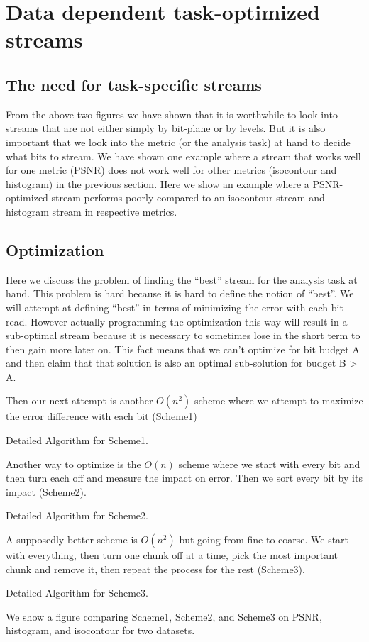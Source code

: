 \section{Data dependent task-optimized streams}

\subsection{The need for task-specific streams}
From the above two figures we have shown that it is worthwhile to look into streams that are not either simply by bit-plane or by levels. But it is also important that we look into the metric (or the analysis task) at hand to decide what bits to stream. We have shown one example where a stream that works well for one metric (PSNR) does not work well for other metrics (isocontour and histogram) in the previous section. Here we show an example where a PSNR-optimized stream performs poorly compared to an isocontour stream and histogram stream in respective metrics.

\subsection{Optimization}
Here we discuss the problem of finding the ``best'' stream for the analysis task at hand. This problem is hard because it is hard to define the notion of ``best''. We will attempt at defining ``best'' in terms of minimizing the error with each bit read. However actually programming the optimization this way will result in a sub-optimal stream because it is necessary to sometimes lose in the short term to then gain more later on. This fact means that we can't optimize for bit budget A and then claim that that solution is also an optimal sub-solution for budget B > A.

Then our next attempt is another $O(n^2)$ scheme where we attempt to maximize the error difference with each bit (Scheme1)

Detailed Algorithm for Scheme1.

Another way to optimize is the $O(n)$ scheme where we start with every bit and then turn each off and measure the impact on error. Then we sort every bit by its impact (Scheme2).

Detailed Algorithm for Scheme2.

A supposedly better scheme is $O(n^2)$ but going from fine to coarse. We start with everything, then turn one chunk off at a time, pick the most important chunk and remove it, then repeat the process for the rest (Scheme3).

Detailed Algorithm for Scheme3.

We show a figure comparing Scheme1, Scheme2, and Scheme3 on PSNR, histogram, and isocontour for two datasets.
